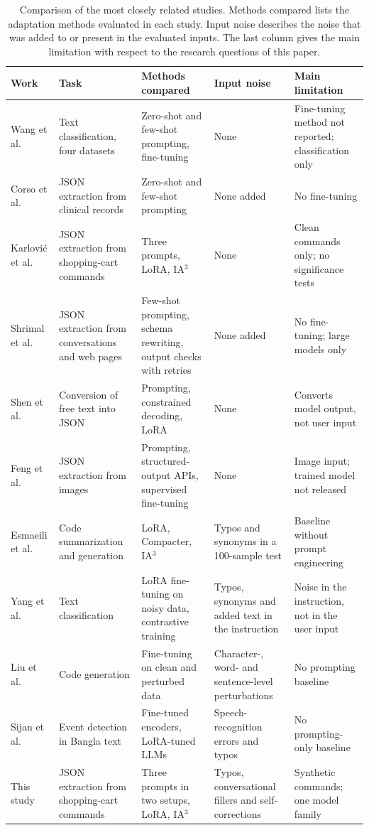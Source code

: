 \documentclass[journal,article,submit,pdftex,moreauthors]{Definitions/mdpi}
\begin{document}
\begin{table}[H]
\caption{Comparison of the most closely related studies. Methods compared lists the adaptation methods evaluated in each study. Input noise describes the noise that was added to or present in the evaluated inputs. The last column gives the main limitation with respect to the research questions of this paper.\label{tab:related}}
\begin{tabularx}{\textwidth}{lXXXX}
\toprule
Work & Task & Methods compared & Input noise & Main limitation \\
\midrule
Wang et al.~\citep{wang2024adaptable} & Text classification, four datasets & Zero-shot and few-shot prompting, fine-tuning & None & Fine-tuning method not reported; classification only \\
Corso et al.~\citep{corso2026clinician} & JSON extraction from clinical records & Zero-shot and few-shot prompting & None added & No fine-tuning \\
Karlovi\'c et al.~\citep{karlovic2026evaluating} & JSON extraction from shopping-cart commands & Three prompts, LoRA, IA$^3$ & None & Clean commands only; no significance tests \\
Shrimal et al.~\citep{shrimal2025parse} & JSON extraction from conversations and web pages & Few-shot prompting, schema rewriting, output checks with retries & None added & No fine-tuning; large models only \\
Shen et al.~\citep{shen2025slot} & Conversion of free text into JSON & Prompting, constrained decoding, LoRA & None & Converts model output, not user input \\
Feng et al.~\citep{feng2026so} & JSON extraction from images & Prompting, structured-output APIs, supervised fine-tuning & None & Image input; trained model not released \\
Esmaeili et al.~\citep{esmaeili2026empirical} & Code summarization and generation & LoRA, Compacter, IA$^3$ & Typos and synonyms in a 100-sample test & Baseline without prompt engineering \\
Yang et al.~\citep{yang2026towards} & Text classification & LoRA fine-tuning on noisy data, contrastive training & Typos, synonyms and added text in the instruction & Noise in the instruction, not in the user input \\
Liu et al.~\citep{liu2026improving} & Code generation & Fine-tuning on clean and perturbed data & Character-, word- and sentence-level perturbations & No prompting baseline \\
Sijan et al.~\citep{sijan2026beyond} & Event detection in Bangla text & Fine-tuned encoders, LoRA-tuned LLMs & Speech-recognition errors and typos & No prompting-only baseline \\
This study & JSON extraction from shopping-cart commands & Three prompts in two setups, LoRA, IA$^3$ & Typos, conversational fillers and self-corrections & Synthetic commands; one model family \\
\bottomrule
\end{tabularx}
\end{table}
\end{document}
